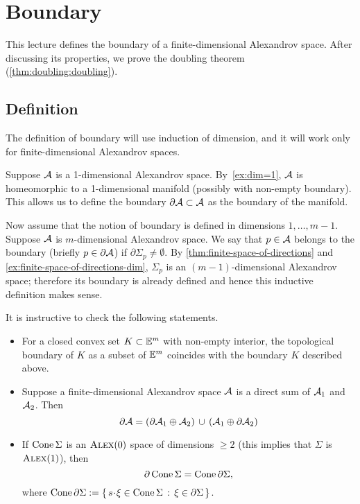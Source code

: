 \chapter{Boundary}\label{chap:bry}

This lecture defines the boundary of a finite-dimensional Alexandrov space.
After discussing its properties, we prove the doubling theorem (\ref{thm:doubling:doubling}).

\section{Definition}

The definition of boundary will use induction of dimension, and it will work only for finite-dimensional Alexandrov spaces.

Suppose $\mathcal{A}$ is a 1-dimensional Alexandrov space.
By~\ref{ex:dim=1},
$\mathcal{A}$ is homeomorphic to a 1-dimensional manifold (possibly with non-empty boundary).
This  allows us to define the boundary $\partial\mathcal{A}\subset \mathcal{A}$ as the boundary of the manifold.

Now assume that the notion of boundary is defined in dimensions $1,\dots,m-1$.
Suppose  $\mathcal{A}$ is $m$-dimensional Alexandrov space.
We say that $p\in \mathcal{A}$ belongs to the boundary (briefly $p\in \partial \mathcal{A}$) if 
$\partial\Sigma_p\ne\emptyset$.
By \ref{thm:finite-space-of-directions} and \ref{ex:finite-space-of-directions-dim}, $\Sigma_p$ is an $(m-1)$-dimensional Alexandrov space;
therefore its boundary is already defined and hence this inductive definition makes sense.

It is instructive to check the following statements.
\begin{itemize}
\item For a closed convex set $K\subset \mathbb{E}^m$ with non-empty interior, the topological boundary of $K$ as a subset of $\mathbb{E}^m$ coincides with the boundary $K$ described above.
\item Suppose a finite-dimensional Alexandrov space $\mathcal{A}$ is a direct sum of $\mathcal{A}_1$ and $\mathcal{A}_2$.
Then
\[\partial \mathcal{A}=(\partial\mathcal{A}_1\oplus\mathcal{A}_2)\,\cup\,(\mathcal{A}_1\oplus\partial\mathcal{A}_2)\]
\item If $\mathop{\rm Cone}\nolimits\Sigma$ is an $\textsc{Alex}(0)$ space of dimensions $\ge 2$ (this implies that $\Sigma$ is  $\textsc{Alex}(1)$), then
\[\partial \mathop{\rm Cone}\nolimits\Sigma=\mathop{\rm Cone}\nolimits\partial\Sigma,\]
where $\Cone\partial\Sigma\df\set{s\cdot \xi\in\Cone\Sigma }{\xi\in \partial\Sigma}$.
\end{itemize}


